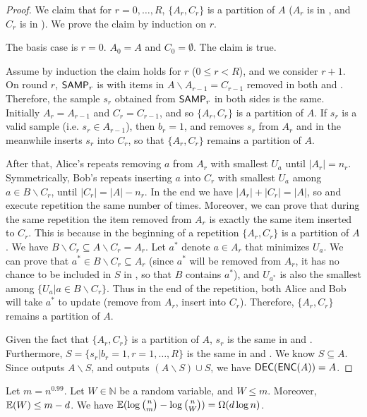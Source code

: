 \begin{proof}
  We claim that for $r=0,\ldots, R$, $\{A_r, C_r\}$ is a partition of $A$ ($A_r$ is in \enc, and $C_r$ is in \dec). We prove the claim by induction on $r$.
  
  The basis case is $r=0$. $A_0=A$ and $C_0=\emptyset$. The claim is true.
  
  Assume by induction the claim holds for $r$ ($0\le r < R$), and we consider $r+1$. 
  On round $r$, $\textsf{SAMP}_r$ is \samp with items in $A\backslash A_{r-1}=C_{r-1}$ removed in both \enc and \dec. Therefore, the sample $s_r$ obtained from $\textsf{SAMP}_r$ in both sides is the same. Initially $A_r=A_{r-1}$ and $C_r=C_{r-1}$, and so $\{A_r,C_r\}$ is a partition of $A$. If $s_r$ is a valid sample (i.e. $s_r\in A_{r-1}$), then $b_r=1$, and \enc removes $s_r$ from $A_r$ and in the meanwhile \dec inserts $s_r$ into $C_r$, so that $\{A_r, C_r\}$ remains a partition of $A$. 
  
  After that, Alice's \enc repeats removing $a$ from $A_r$ with smallest $U_a$ until $|A_r|=n_r$. Symmetrically, Bob's \dec repeats inserting $a$ into $C_r$ with smallest $U_a$ among $a\in B\backslash C_r$, until $|C_r|=|A|-n_r$. In the end we have $|A_r|+|C_r|=|A|$, so \enc and \dec execute repetition the same number of times. Moreover, we can prove that during the same repetition the item removed from $A_r$ is exactly the same item inserted to $C_r$. This is because in the beginning of a repetition $\{A_r, C_r\}$ is a partition of $A$. We have $B\backslash C_r\subseteq A\backslash C_r=A_r$. Let $a^*$ denote  $a\in A_r$ that minimizes $U_a$. We can prove that $a^*\in B\backslash C_r\subseteq A_r$ (since $a^*$ will be removed from $A_r$, it has no chance to be included in $S$ in \enc, so that $B$ contains $a^*$), and $U_{a^*}$ is also the smallest among $\{U_a|a\in B\backslash C_r\}$. Thus in the end of the repetition, both Alice and Bob will take $a^{*}$ to update (remove from $A_r$, insert into $C_r$). Therefore, $\{A_r, C_r\}$ remains a partition of $A$.
  
  Given the fact that $\{A_r, C_r\}$ is a partition of $A$, $s_r$ is the same in \enc and \dec. Furthermore, $S=\{s_r|b_r=1,r=1,\ldots, R\}$ is the same in \enc and \dec. We know $S\subseteq A$. Since \enc outputs $A\backslash S$, and \dec outputs $(A\backslash S)\cup S$, we have $\textsf{DEC}(\textsf{ENC}(A))=A$. 
\end{proof}

\begin{lemma} \label{lemma:bits-saving}
  Let $m=n^{0.99}$. Let $W\in \mathbb{N}$ be a random variable, and $W\le m$. Moreover, $\operatorname*{\mathbb{E}}(W)\le m-d$. We have $\operatorname*{\mathbb{E}}(\log {n \choose m}-\log {n \choose W})=\Omega(d \log n)$.
\end{lemma}

